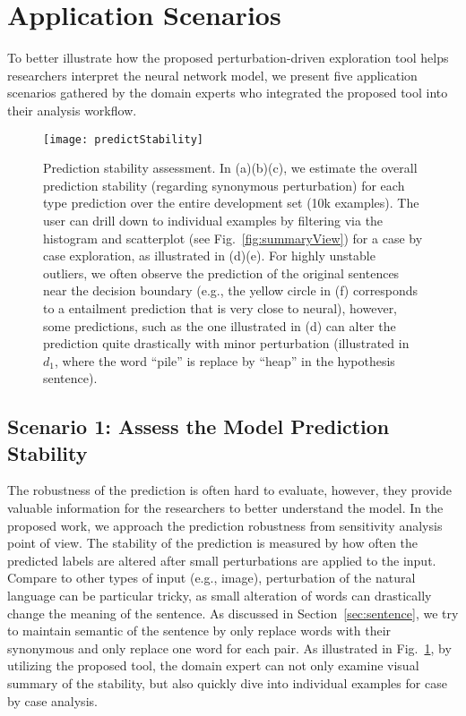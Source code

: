 \section{Application Scenarios}
\label{sec:caseStudy}
To better illustrate how the proposed perturbation-driven exploration tool helps researchers interpret the neural network model, we present five application scenarios gathered by the domain experts who integrated the proposed tool into their analysis workflow.

\begin{figure}[htbp]
\centering
 \texttt{[image: predictStability]}
 \caption{
Prediction stability assessment. In (a)(b)(c), we estimate the overall prediction stability (regarding synonymous perturbation) for each type prediction over the entire development set (10k examples). The user can drill down to individual examples by filtering via the histogram and scatterplot (see Fig.~\ref{fig:summaryView}) for a case by case exploration, as illustrated in (d)(e). For highly unstable outliers, we often observe the prediction of the original sentences near the decision boundary (e.g., the yellow circle in (f) corresponds to a entailment prediction that is very close to neural), however, some predictions, such as the one illustrated in (d) can alter the prediction quite drastically with minor perturbation (illustrated in $d_1$, where the word ``pile'' is replace by ``heap'' in the hypothesis sentence).
%
}
\label{fig:predictStability}
\end{figure}

\subsection{Scenario 1: Assess the Model Prediction Stability}
The robustness of the prediction is often hard to evaluate, however, they provide valuable information for the researchers to better understand the model.
%
In the proposed work, we approach the prediction robustness from sensitivity analysis point of view. The stability of the prediction is measured by how often the predicted labels are altered after small perturbations are applied to the input. 
%
Compare to other types of input (e.g., image), perturbation of the natural language can be particular tricky, as small alteration of words can drastically change the meaning of the sentence. As discussed in Section~\ref{sec:sentence}, we try to maintain semantic of the sentence by only replace words with their synonymous and only replace one word for each pair.
As illustrated in Fig.~\ref{fig:predictStability}, by utilizing the proposed tool, the domain expert can not only examine visual summary of the stability, but also quickly dive into individual examples for case by case analysis.


